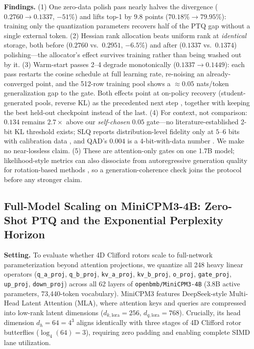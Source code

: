 \documentclass{article}
\begin{document}
\textbf{Findings.} (1) One zero-data polish pass nearly halves the
divergence ($0.2760\to0.1337$, $-51\%$) and lifts top-1 by $9.8$
points ($70.18\%\to79.95\%$): training only the quantization parameters
recovers half of the PTQ gap without a single external token. (2)
Hessian rank allocation beats uniform rank at \emph{identical} storage,
both before ($0.2760$ vs.\ $0.2951$, $-6.5\%$) and after ($0.1337$
vs.\ $0.1374$) polishing---the allocator's effect survives training
rather than being washed out by it. (3) Warm-start passes 2--4 degrade
monotonically ($0.1337\to0.1449$): each pass restarts the cosine
schedule at full learning rate, re-noising an already-converged point,
and the 512-row training pool shows a $\approx 0.05$ nats/token
generalization gap to the gate. Both effects point at on-policy
recovery (student-generated pools, reverse KL) as the precedented next
step \citep{wang2026onlineqat,agarwal2024gkd}, together with keeping
the best held-out checkpoint instead of the last. (4) For context, not
comparison: $0.134$ remains $2.7\times$ above our \emph{self-chosen}
$0.05$ gate---no literature-established 2-bit KL threshold exists; SLQ
reports distribution-level fidelity only at $5$--$6$ bits with
calibration data \citep{helcig2026slq}, and QAD's $0.004$ is a
4-bit-with-data number \citep{xin2026qad}. We make no near-lossless
claim. (5) These are attention-only gates on one 1.7B model;
likelihood-style metrics can also dissociate from autoregressive
generation quality for rotation-based methods \citep{prejzner2026bielik},
so a generation-coherence check joins the protocol before any stronger
claim.

\subsection{Full-Model Scaling on MiniCPM3-4B: Zero-Shot PTQ and the Exponential Perplexity Horizon}
\label{sec:minicpm3}

\textbf{Setting.} To evaluate whether 4D Clifford rotors scale to full-network parameterization beyond attention projections, we quantize all 248 heavy linear operators (\texttt{q\_a\_proj}, \texttt{q\_b\_proj}, \texttt{kv\_a\_proj}, \texttt{kv\_b\_proj}, \texttt{o\_proj}, \texttt{gate\_proj}, \texttt{up\_proj}, \texttt{down\_proj}) across all 62 layers of \texttt{openbmb/MiniCPM3-4B} (3.8B active parameters, 73,440-token vocabulary). MiniCPM3 features DeepSeek-style Multi-Head Latent Attention (MLA), where attention keys and queries are compressed into low-rank latent dimensions ($d_{k,\text{lora}}=256$, $d_{q,\text{lora}}=768$). Crucially, its head dimension $d_h=64=4^3$ aligns identically with three stages of 4D Clifford rotor butterflies ($\log_4(64)=3$), requiring zero padding and enabling complete SIMD lane utilization.
\end{document}
